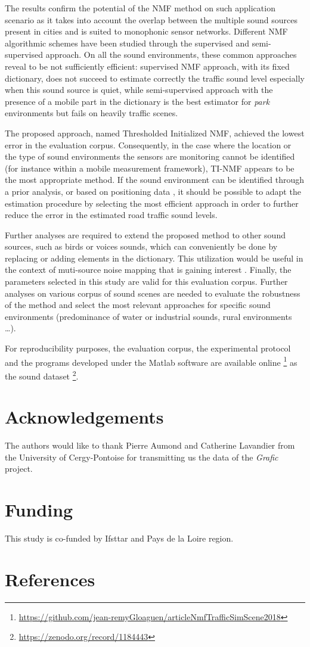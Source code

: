 \documentclass[review,5p,twocolumn,sort&compress,times]{elsarticle}
\begin{document}
The results confirm the potential of the NMF method on such application scenario as it takes into account the overlap between the multiple sound sources present in cities and is suited to monophonic sensor networks. Different NMF algorithmic schemes have been studied through the supervised and semi-supervised approach. On all the sound environments, these common approaches reveal to be not sufficiently efficient: supervised NMF approach, with its fixed dictionary, does not succeed to estimate correctly the traffic sound level especially when this sound source is quiet, while semi-supervised approach with the presence of a mobile part in the dictionary is the best estimator for \textit{park} environments but fails on heavily traffic scenes.

The proposed approach, named Thresholded Initialized NMF, achieved the lowest error in the evaluation corpus. Consequently, in the case where the location or the type of sound environments the sensors are monitoring cannot be identified (for instance within a mobile measurement framework), TI-NMF appears to be the most appropriate method. If the sound environment can be identified through a prior analysis, or based on positioning data \cite{can2015noise,lavandier2016urban}, it should be possible to adapt the estimation procedure by selecting the most efficient approach in order to further reduce the error in the estimated road traffic sound levels.

Further analyses are required to extend the proposed method to other sound sources, such as birds or voices sounds, which can conveniently be done by replacing or adding elements in the dictionary. This utilization would be useful in the context of muti-source noise mapping that is gaining interest \cite{aumond2017Probabilistic, aletta2015soundscape}. Finally, the parameters selected in this study are valid for this evaluation corpus. Further analyses on various corpus of sound scenes are needed to evaluate the robustness of the method and select the most relevant approaches for specific sound environments (predominance of water or industrial sounds, rural environments \dots).

For reproducibility purposes, the evaluation corpus, the experimental protocol and the programs developed under the Matlab software are available online \footnote{\url{https://github.com/jean-remyGloaguen/articleNmfTrafficSimScene2018}} as the sound dataset \footnote{\url{https://zenodo.org/record/1184443}}. 

\section*{Acknowledgements}
The authors would like to thank Pierre Aumond and Catherine Lavandier from the University of Cergy-Pontoise for transmitting us the data of the \textit{Grafic} project.

\section*{Funding}
This study is co-funded by Ifsttar and Pays de la Loire region.

\section*{References}


\end{document}
